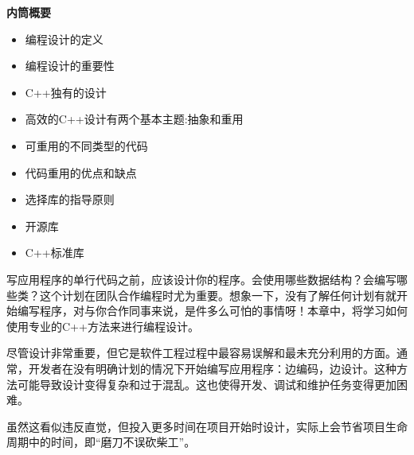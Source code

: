 \noindent
\textbf{内筒概要}

\begin{itemize}
\item
编程设计的定义

\item
编程设计的重要性

\item
C++独有的设计

\item
高效的C++设计有两个基本主题:抽象和重用

\item
可重用的不同类型的代码

\item
代码重用的优点和缺点

\item
选择库的指导原则

\item
开源库

\item
C++标准库
\end{itemize}

写应用程序的单行代码之前，应该设计你的程序。会使用哪些数据结构？会编写哪些类？这个计划在团队合作编程时尤为重要。想象一下，没有了解任何计划有就开始编写程序，对与你合作同事来说，是件多么可怕的事情呀！本章中，将学习如何使用专业的C++方法来进行编程设计。

尽管设计非常重要，但它是软件工程过程中最容易误解和最未充分利用的方面。通常，开发者在没有明确计划的情况下开始编写应用程序：边编码，边设计。这种方法可能导致设计变得复杂和过于混乱。这也使得开发、调试和维护任务变得更加困难。

虽然这看似违反直觉，但投入更多时间在项目开始时设计，实际上会节省项目生命周期中的时间，即“磨刀不误砍柴工”。












